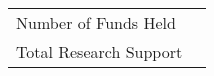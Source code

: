 
\begin{center}
\begin{tabularx}{0.5\linewidth}{lR}
	\toprule
	Number of Funds Held & \numoffunds{} \\ 
	Total Research Support & \totalfunds{} \\ 
	\bottomrule
\end{tabularx}
\end{center}

